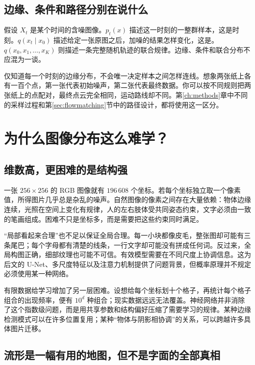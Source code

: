 \subsection{边缘、条件和路径分别在说什么}

假设 $X_t$ 是某个时间的含噪图像。$p_t(x)$ 描述这一时刻的一整群样本，这是时刻。$q(x_t\mid x_0)$ 描述给定一张原图之后，加噪的结果怎样变化，这是。$q(x_0,x_1,\ldots,x_K)$ 则描述一条完整随机轨迹的联合规律。边缘、条件和联合分布不应混为一谈。

仅知道每一个时刻的边缘分布，不会唯一决定样本之间怎样连线。想象两张纸上各有一百个点，第一张代表初始噪声，第二张代表最终数据。你可以按不同规则把两张纸上的点配对，最终点云完全相同，运动路线却不同。第\ref{ch:methods}章中不同的采样过程和第\ref{sec:flowmatching}节中的路径设计，都将使用这一区分。

\section{为什么图像分布这么难学？}
\label{sec:c-geometry}

\subsection{维数高，更困难的是结构强}

一张 $256\times256$ 的 RGB 图像就有 $196\,608$ 个坐标。若每个坐标独立取一个像素值，所得图片几乎总是杂乱的噪声。自然图像的像素之间存在大量依赖：物体边缘连续，光照在空间上变化有规律，人的左右肢体受共同姿态约束，文字必须由一致的笔画组成。困难不只是坐标多，而是需要把这些约束同时满足。

“局部看起来合理”也不足以保证全局合理。每一小块都像皮毛，整张图却可能有三条尾巴；每个字母都有清楚的线条，一行文字却可能没有拼成任何词。反过来，全局构图正确，细部纹理也可能不可信。有效模型需要在不同尺度上协调信息。这为后文的 U-Net、多尺度特征以及注意力机制提供了问题背景，但概率原理并不规定必须使用某一种网络。

有限数据给学习增加了另一层困难。设想给每个坐标划十个格子，再统计每个格子组合的出现频率，便有 $10^d$ 种组合；现实数据远远无法覆盖。神经网络并非消除了这个指数级问题，而是用共享参数和结构偏好压缩了需要学习的规律。某种边缘检测模式可以在许多位置复用；某种“物体与阴影相协调”的关系，可以跨越许多具体图片迁移。

\subsection{流形是一幅有用的地图，但不是字面的全部真相}

